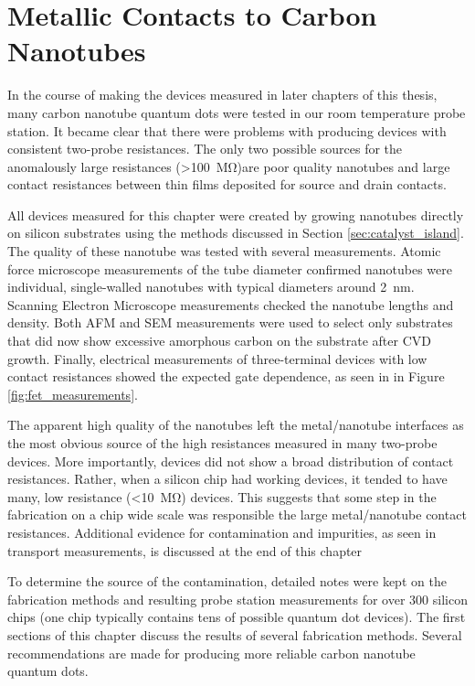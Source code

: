 \chapter{Metallic Contacts to Carbon Nanotubes}
\label{chap:contacts}

In the course of making the devices measured in later chapters of this thesis, many carbon nanotube quantum dots were tested in our room temperature probe station. It became clear that there were problems with producing devices with consistent two-probe resistances. The only two possible sources for the anomalously large resistances (>\SI{100}{\mega\ohm})are poor quality nanotubes and large contact resistances between thin films deposited for source and drain contacts. 

All devices measured for this chapter were created by growing nanotubes directly on silicon substrates using the methods discussed in Section \ref{sec:catalyst_island}. The quality of these nanotube was tested with several measurements. Atomic force microscope measurements of the tube diameter confirmed nanotubes were individual, single-walled nanotubes with typical diameters around \SI{2}{\nano\meter}. Scanning Electron Microscope measurements checked the nanotube lengths and density. Both AFM and SEM measurements were used to select only substrates that did now show excessive amorphous carbon on the substrate after CVD growth. Finally, electrical measurements of three-terminal devices with low contact resistances showed the expected gate dependence, as seen in in Figure \ref{fig:fet_measurements}.

The apparent high quality of the nanotubes left the metal/nanotube interfaces as the most obvious source of the high resistances measured in many two-probe devices. More importantly, devices did not show a broad distribution of contact resistances. Rather, when a silicon chip had working devices, it tended to have many, low resistance (<\SI{10}{\mega\ohm}) devices. This suggests that some step in the fabrication on a chip wide scale was responsible the large metal/nanotube contact resistances. Additional evidence for contamination and impurities, as seen in transport measurements, is discussed at the end of this chapter

To determine the source of the contamination, detailed notes were kept on the fabrication methods and resulting probe station measurements for over 300 silicon chips (one chip typically contains tens of possible quantum dot devices). The first sections of this chapter discuss the results of several fabrication methods. Several recommendations are made for producing more reliable carbon nanotube quantum dots.

